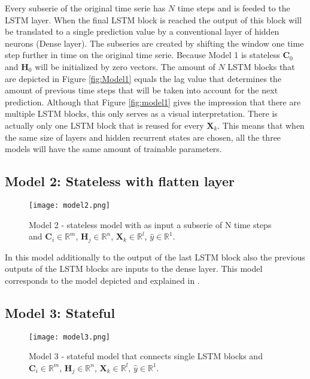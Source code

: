 Every subserie of the original time serie has $ N $ time steps and is feeded to the LSTM layer. When the final LSTM block is reached the output of this block will be translated to a single prediction value by a conventional layer of hidden neurons (Dense layer). The subseries are created by shifting the window one time step further in time on the original time serie. Because Model 1 is stateless $ \bm{C}_{0} $ and $ \bm{H}_{0} $ will be initialized by zero vectors. The amount of $ N $ LSTM blocks that are depicted in Figure \ref{fig:Model1} equals the lag value that determines the amount of previous time steps that will be taken into account for the next prediction. Although that Figure \ref{fig:model1} gives the impression that there are multiple LSTM blocks, this only serves as a visual interpretation. There is actually only one LSTM block that is reused for every $ \bm{X}_{k} $. This means that when the same size of layers and hidden recurrent states are chosen, all the three models will have the same amount of trainable parameters. 


\subsection{Model 2: Stateless with flatten layer}\label{s:Model2}

\begin{figure}[h]
	\centering
	\texttt{[image: model2.png]}
	\caption{Model 2 - stateless model with as input a subserie of N time steps and $ \bm{C}_{i} \in \mathbb{R}^{m} $, $ \bm{H}_{j} \in \mathbb{R}^{n} $, $ \bm{X}_{k} \in \mathbb{R}^{l} $, $ \hat{y} \in \mathbb{R}^{1} $.}
	\label{fig:model2}
\end{figure}

In this model additionally to the output of the last LSTM block also the previous outputs of the LSTM blocks are inputs to the dense layer. This model corresponds to the model depicted and explained in \cite{Kong2019}.

\subsection{Model 3: Stateful}\label{s:Model3}
\begin{figure}[hb]
	\centering
	\texttt{[image: model3.png]}
	\caption{Model 3 - stateful model that connects single LSTM blocks and $ \bm{C}_{i} \in \mathbb{R}^{m} $, $ \bm{H}_{j} \in \mathbb{R}^{n} $, $ \bm{X}_{k} \in \mathbb{R}^{l} $, $ \hat{y} \in \mathbb{R}^{1} $.}
	\label{fig:model3}
\end{figure}


